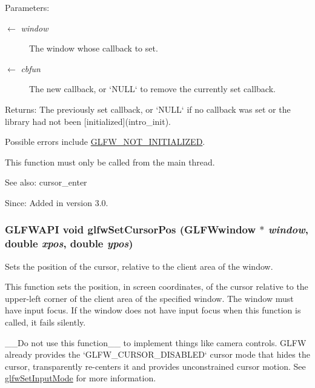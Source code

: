 \begin{Desc}
\item[Parameters:]
\begin{description}
\item[\mbox{$\leftarrow$} {\em window}]The window whose callback to set. \item[\mbox{$\leftarrow$} {\em cbfun}]The new callback, or `NULL` to remove the currently set callback. \end{description}
\end{Desc}
\begin{Desc}
\item[Returns:]The previously set callback, or `NULL` if no callback was set or the library had not been \mbox{[}initialized\mbox{]}(intro\_\-init).\end{Desc}
Possible errors include \hyperlink{group__errors_g2374ee02c177f12e1fa76ff3ed15e14a}{GLFW\_\-NOT\_\-INITIALIZED}.

This function must only be called from the main thread.

\begin{Desc}
\item[See also:]cursor\_\-enter\end{Desc}
\begin{Desc}
\item[Since:]Added in version 3.0. \end{Desc}
\hypertarget{group__input_gaf152cc93418acb0ba342e3f4af922bc}{
\subsubsection[glfwSetCursorPos]{\setlength{\rightskip}{0pt plus 5cm}GLFWAPI void glfwSetCursorPos ({\bf GLFWwindow} $\ast$ {\em window}, \/  double {\em xpos}, \/  double {\em ypos})}}
\label{group__input_gaf152cc93418acb0ba342e3f4af922bc}


Sets the position of the cursor, relative to the client area of the window. 

This function sets the position, in screen coordinates, of the cursor relative to the upper-left corner of the client area of the specified window. The window must have input focus. If the window does not have input focus when this function is called, it fails silently.

\_\-\_\-Do not use this function\_\-\_\- to implement things like camera controls. GLFW already provides the `GLFW\_\-CURSOR\_\-DISABLED` cursor mode that hides the cursor, transparently re-centers it and provides unconstrained cursor motion. See \hyperlink{group__input_ge1eb729d2dd91dc33fd60e150a6e1684}{glfwSetInputMode} for more information.

